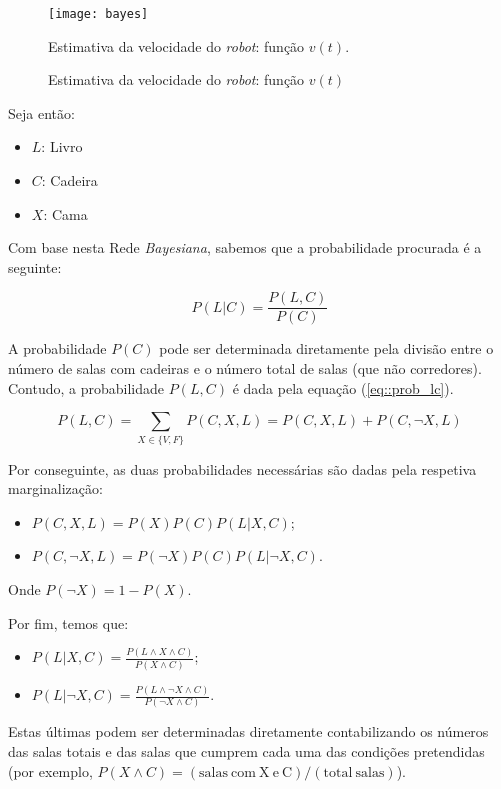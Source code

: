 \begin{figure}[!htbp]
    \centering
    \texttt{[image: bayes]}
    \caption{Estimativa da velocidade do \textit{robot}: função $v(t)$}{Estimativa da velocidade do \textit{robot}: função $v(t)$.}
    \label{fig::bayes}
\end{figure}

Seja então:
\begin{itemize}
    \item $L$: Livro
    \item $C$: Cadeira
    \item $X$: Cama
\end{itemize}

Com base nesta Rede \textit{Bayesiana}, sabemos que a probabilidade procurada é a seguinte:

\begin{equation}
    P(L|C) = \frac{P(L,C)}{P(C)}
\end{equation}

A probabilidade $P(C)$ pode ser determinada diretamente pela divisão entre o número de salas com cadeiras e o número total de salas (que não corredores). Contudo, a probabilidade $P(L,C)$ é dada pela equação (\ref{eq::prob_lc}).

\begin{equation}
    P(L,C) = \sum_{X \in \{V,F\}}{P(C,X,L)} = P(C,X,L) + P(C,\neg X,L)
    \label{eq::prob_lc}
\end{equation}

Por conseguinte, as duas probabilidades necessárias são dadas pela respetiva marginalização:
\begin{itemize}
    \item $P(C,X,L) = P(X)P(C)P(L|X,C)$;
    \item $P(C,\neg X,L) = P(\neg X)P(C)P(L|\neg X,C)$.
\end{itemize}

Onde $P(\neg X) = 1-P(X)$.

Por fim, temos que:
\begin{itemize}
    \item $P(L|X,C) = \frac{P(L \wedge X \wedge C)}{P(X \wedge C)}$;
    \item $P(L|\neg X,C) = \frac{P(L \wedge \neg X \wedge C)}{P(\neg X \wedge C)}$.
\end{itemize}

Estas últimas podem ser determinadas diretamente contabilizando os números das salas totais e das salas que cumprem cada uma das condições pretendidas (por exemplo, $P(X \wedge C) = (\mathrm{salas~com~X~e~C}) / (\mathrm{total~salas})$).

